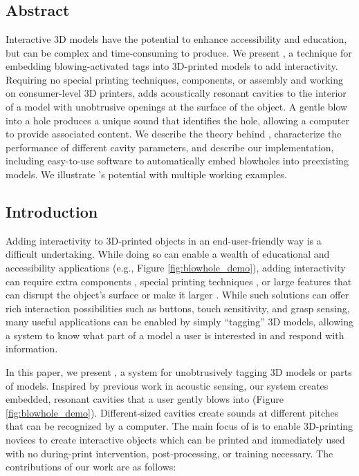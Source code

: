 \chapter{\bh}
  \section{Abstract}
    Interactive 3D models have the potential to enhance accessibility and
    education, but can be complex and time-consuming to produce. We present
    \textit{\bh}, a technique for embedding blowing-activated tags into
    3D-printed models to add interactivity. Requiring no special printing
    techniques, components, or assembly and working on consumer-level 3D
    printers, \bh adds acoustically resonant cavities to the interior of a model
    with unobtrusive openings at the surface of the object. A gentle blow into a
    hole produces a unique sound that identifies the hole, allowing a computer
    to provide associated content. We describe the theory behind \bh,
    characterize the performance of different cavity parameters, and describe
    our implementation, including easy-to-use software to automatically embed
    blowholes into preexisting models. We illustrate \bh's potential with
    multiple working examples. 
  
  \section{Introduction}
    Adding interactivity to 3D-printed objects in an end-user-friendly way is a
    difficult undertaking. While doing so can enable a wealth of educational and
    accessibility applications (e.g., Figure \ref{fig:blowhole_demo}), adding
    interactivity can require extra components \cite{Savage:2013kua,
    Hook:2014kp}, special printing techniques \cite{Schmitz:2015vj,
    Bacher:2016ji, Peng:2015hr}, or large features that can disrupt the object's
    surface \cite{Harrison:2012kw, Ou:2016db, Savage:2015cs, Shi:2016ff} or make
    it larger \cite{Li:2016bt}. While such solutions can offer rich interaction
    possibilities such as buttons, touch sensitivity, and grasp sensing, many
    useful applications can be enabled by simply ``tagging'' 3D models, allowing
    a system to know what part of a model a user is interested in and respond
    with information.
    
    In this paper, we present \textit{\bh}, a system for unobtrusively tagging
    3D models or parts of models. Inspired by previous work in acoustic sensing,
    our system creates embedded, resonant cavities that a user gently blows into
    (Figure \ref{fig:blowhole_demo}). Different-sized cavities create sounds at
    different pitches that can be recognized by a computer. The main focus of
    \bh is to enable 3D-printing novices to create interactive objects which can
    be printed and immediately used with no during-print intervention,
    post-processing, or training necessary. The contributions of our work are as
    follows:

